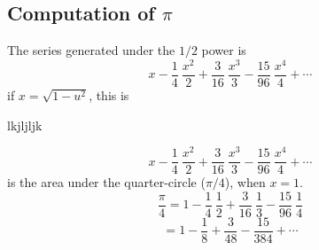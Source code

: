 \documentclass[11pt, oneside]{article}
\begin{document}
\subsection*{Computation of $\pi$}
The series generated under the $1/2$ power is 
\[ x - \frac{1}{4} \ \frac{x^2}{2} + \frac{3}{16} \ \frac{x^3}{3} - \frac{15}{96} \ \frac{x^4}{4}  + \cdots \]
if $x = \sqrt{1-u^2}$, this is



lkjljljk



\[ x - \frac{1}{4} \ \frac{x^2}{2} + \frac{3}{16} \ \frac{x^3}{3} - \frac{15}{96} \ \frac{x^4}{4}  + \cdots \]
is the area under the quarter-circle ($\pi/4$), when $x=1$.
\[ \frac{\pi}{4} = 1 - \frac{1}{4} \ \frac{1}{2} + \frac{3}{16} \ \frac{1}{3} - \frac{15}{96} \ \frac{1}{4}  \]
\[ = 1 - \frac{1}{8} + \frac{3}{48} - \frac{15}{384} + \cdots  \]
\end{document}
